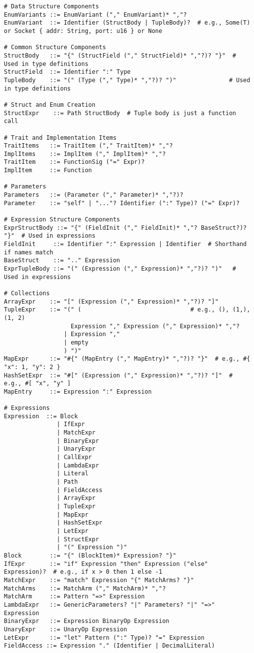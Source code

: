 \begin{verbatim}
# Data Structure Components
EnumVariants ::= EnumVariant ("," EnumVariant)* ","?
EnumVariant  ::= Identifier (StructBody | TupleBody)?  # e.g., Some(T) or Socket { addr: String, port: u16 } or None

# Common Structure Components
StructBody   ::= "{" (StructField ("," StructField)* ","?)? "}"  # Used in type definitions
StructField  ::= Identifier ":" Type
TupleBody    ::= "(" (Type ("," Type)* ","?)? ")"               # Used in type definitions

# Struct and Enum Creation
StructExpr    ::= Path StructBody  # Tuple body is just a function call

# Trait and Implementation Items
TraitItems   ::= TraitItem ("," TraitItem)* ","?
ImplItems    ::= ImplItem ("," ImplItem)* ","?
TraitItem    ::= FunctionSig ("=" Expr)?
ImplItem     ::= Function

# Parameters
Parameters   ::= (Parameter ("," Parameter)* ","?)?
Parameter    ::= "self" | "..."? Identifier (":" Type)? ("=" Expr)?

# Expression Structure Components
ExprStructBody ::= "{" (FieldInit ("," FieldInit)* ","? BaseStruct?)? "}"  # Used in expressions
FieldInit     ::= Identifier ":" Expression | Identifier  # Shorthand if names match
BaseStruct    ::= ".." Expression
ExprTupleBody ::= "(" (Expression ("," Expression)* ","?)? ")"   # Used in expressions

# Collections
ArrayExpr    ::= "[" (Expression ("," Expression)* ","?)? "]"
TupleExpr    ::= "(" (                               # e.g., (), (1,), (1, 2)
                   Expression "," Expression ("," Expression)* ","?
                 | Expression ","
                 | empty
                 ) ")"
MapExpr      ::= "#{" (MapEntry ("," MapEntry)* ","?)? "}"  # e.g., #{ "x": 1, "y": 2 }
HashSetExpr  ::= "#[" (Expression ("," Expression)* ","?)? "]"  # e.g., #[ "x", "y" ]
MapEntry     ::= Expression ":" Expression

# Expressions
Expression  ::= Block 
               | IfExpr 
               | MatchExpr 
               | BinaryExpr 
               | UnaryExpr 
               | CallExpr 
               | LambdaExpr 
               | Literal 
               | Path
               | FieldAccess 
               | ArrayExpr 
               | TupleExpr
               | MapExpr 
               | HashSetExpr
               | LetExpr
               | StructExpr
               | "(" Expression ")"
Block        ::= "{" (BlockItem)* Expression? "}"
IfExpr       ::= "if" Expression "then" Expression ("else" Expression)?  # e.g., if x > 0 then 1 else -1
MatchExpr    ::= "match" Expression "{" MatchArms? "}"
MatchArms    ::= MatchArm ("," MatchArm)* ","?
MatchArm     ::= Pattern "=>" Expression
LambdaExpr   ::= GenericParameters? "|" Parameters? "|" "=>" Expression
BinaryExpr   ::= Expression BinaryOp Expression
UnaryExpr    ::= UnaryOp Expression
LetExpr      ::= "let" Pattern (":" Type)? "=" Expression
FieldAccess ::= Expression "." (Identifier | DecimalLiteral)


\end{verbatim}
